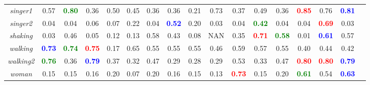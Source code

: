 \documentclass[preprint,12pt,review]{elsarticle}
\begin{document}
\begin{table*}[htp]
{\begin{tabular}{|c|c|c|c|c|c|c|c|c|c|c|c|c|c|c|c|c|}
\emph{singer1}   &0.57   &\textcolor{green}{\textbf{0.80}}  &0.36 &0.50  &0.45 &0.36 &0.36 &0.21 &0.73 &0.37 &0.49  &0.36  &\textcolor{red}{\textbf{0.85}}  &0.76 &\textcolor{blue}{\textbf{0.81}} \\
\emph{singer2}   &0.04  &0.04  &0.06  &0.07  &0.22 &0.04  &\textcolor{blue}{\textbf{0.52}}  &0.20  &0.03 &0.04 &\textcolor{green}{\textbf{0.42 }} &0.04  &0.04  &\textcolor{red}{\textbf{0.69}}  &0.03\\
\emph{shaking}   &0.03   &0.46  &0.05 &0.12  &0.13 &0.58  &0.43 &0.08  &NAN   &0.35   &\textcolor{red}{\textbf{0.71}}  &\textcolor{green}{\textbf{0.58}}  &0.01 &\textcolor{blue}{\textbf{0.61}} &0.57 \\
\emph{walking}   &\textcolor{blue}{\textbf{0.73}}   &\textcolor{green}{\textbf{0.74}}  &\textcolor{red}{\textbf{0.75}}   &0.17 &0.65 &0.55  &0.55  &0.55 &0.46 &0.59 &0.57 &0.55 &0.40 &0.44 &0.42 \\
\emph{walking2}  &\textcolor{green}{\textbf{0.76}}   &0.36  &\textcolor{blue}{\textbf{0.79}} &0.37  &0.32 &0.47 &0.29 &0.28  &0.29 &0.53 &0.33 &0.47 &\textcolor{red}{\textbf{0.80}} &\textcolor{red}{\textbf{0.80}} &\textcolor{blue}{\textbf{0.79}}\\
\emph{woman}  &0.15   &0.15  &0.16  &0.20  &0.07 &0.20  &0.16  &0.15  &0.13  &\textcolor{red}{\textbf{0.73}}  &0.15 &0.20  &\textcolor{green}{\textbf{0.61}} &0.54 &\textcolor{blue}{\textbf{0.63}} \\
\hline
\end{tabular}}
\label{tab:overlaprate}
\end{table*}
\end{document}
